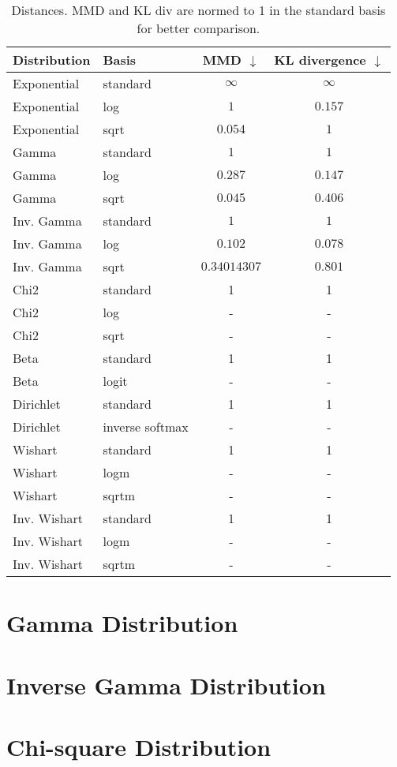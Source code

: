 \documentclass{article}
\begin{document}
\begin{table}[htb]
	\centering
	\caption{Distances. MMD and KL div are normed to 1 in the standard basis for better comparison. }
	\begin{tabular}{llcc}
		\toprule
		\textbf{Distribution} & Basis & MMD $\downarrow$& KL divergence $\downarrow$ \\
		\midrule
		Exponential	& standard & $\infty$ & $\infty$ \\
		Exponential	& log & $1$ & $0.157 $ \\ 
		Exponential	& sqrt & $0.054$ & $1$ \\ 
		\hdashline
		Gamma		& standard & $1$ & $1$  \\ 
		Gamma		& log & $0.287$ & $0.147$  \\
		Gamma		& sqrt & $0.045$ & $0.406$ \\
		\hdashline
		Inv. Gamma & standard & $1$ & $1$ \\
		Inv. Gamma & log & $0.102$ & $0.078$ \\ 
		Inv. Gamma & sqrt & $0.34014307$ & $0.801$ \\
		\hdashline
		Chi2        & standard & 1 & 1 \\
		Chi2        & log & - & - \\
		Chi2        & sqrt & - & - \\
		\hdashline
		Beta		& standard & 1 & 1 \\
		Beta		& logit & - & - \\
		\hdashline
		Dirichlet 	& standard &  1 & 1 \\		
		Dirichlet 	& inverse softmax &  - & - \\
		\hdashline
		Wishart	    & standard & 1 & 1 \\
		Wishart	    & logm & - & - \\
		Wishart	    & sqrtm & - & - \\
		\hdashline
		Inv. Wishart & standard & 1 & 1 \\
		Inv. Wishart & logm & - & - \\
		Inv. Wishart & sqrtm & - & - \\
		\bottomrule
	\end{tabular}
\end{table}

\pagebreak



\section{Gamma Distribution}
\label{sec:gamma}


\section{Inverse Gamma Distribution}
\label{sec:inv_gamma}


\section{Chi-square Distribution}
\label{sec:chi2}











\end{document}
